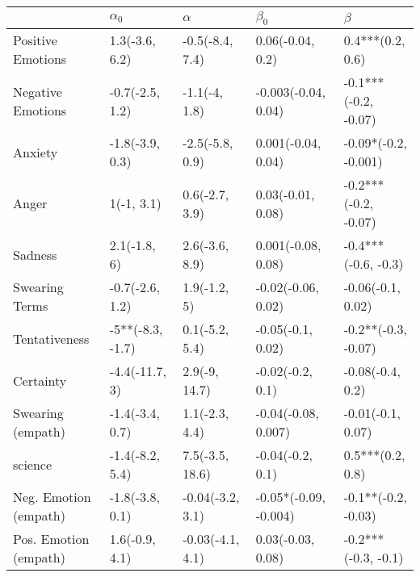 \begin{tabular}{lllll}
\toprule
{} &        $\alpha_0$ &          $\alpha$ &              $\beta_0$ &               $\beta$ \\
\midrule
Positive Emotions     &    1.3(-3.6, 6.2) &   -0.5(-8.4, 7.4) &       0.06(-0.04, 0.2) &      0.4***(0.2, 0.6) \\
Negative Emotions     &   -0.7(-2.5, 1.2) &     -1.1(-4, 1.8) &    -0.003(-0.04, 0.04) &  -0.1***(-0.2, -0.07) \\
Anxiety               &   -1.8(-3.9, 0.3) &   -2.5(-5.8, 0.9) &     0.001(-0.04, 0.04) &  -0.09*(-0.2, -0.001) \\
Anger                 &        1(-1, 3.1) &    0.6(-2.7, 3.9) &      0.03(-0.01, 0.08) &  -0.2***(-0.2, -0.07) \\
Sadness               &      2.1(-1.8, 6) &    2.6(-3.6, 8.9) &     0.001(-0.08, 0.08) &   -0.4***(-0.6, -0.3) \\
Swearing Terms        &   -0.7(-2.6, 1.2) &      1.9(-1.2, 5) &     -0.02(-0.06, 0.02) &     -0.06(-0.1, 0.02) \\
Tentativeness         &  -5**(-8.3, -1.7) &    0.1(-5.2, 5.4) &      -0.05(-0.1, 0.02) &   -0.2**(-0.3, -0.07) \\
Certainty             &    -4.4(-11.7, 3) &     2.9(-9, 14.7) &       -0.02(-0.2, 0.1) &      -0.08(-0.4, 0.2) \\
Swearing (empath)     &   -1.4(-3.4, 0.7) &    1.1(-2.3, 4.4) &    -0.04(-0.08, 0.007) &     -0.01(-0.1, 0.07) \\
science               &   -1.4(-8.2, 5.4) &   7.5(-3.5, 18.6) &       -0.04(-0.2, 0.1) &      0.5***(0.2, 0.8) \\
Neg. Emotion (empath) &   -1.8(-3.8, 0.1) &  -0.04(-3.2, 3.1) &  -0.05*(-0.09, -0.004) &   -0.1**(-0.2, -0.03) \\
Pos. Emotion (empath) &    1.6(-0.9, 4.1) &  -0.03(-4.1, 4.1) &      0.03(-0.03, 0.08) &   -0.2***(-0.3, -0.1) \\
\bottomrule
\end{tabular}

